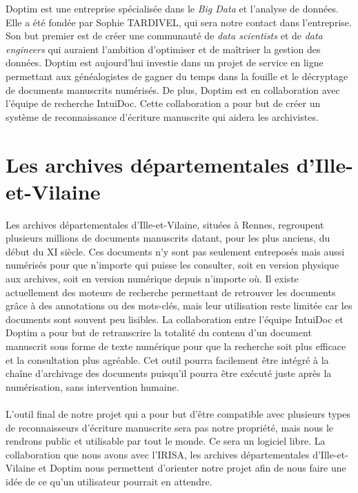 Doptim est une entreprise spécialisée dans le \textit{Big Data} et l’analyse de données.
Elle a été fondée par Sophie TARDIVEL, qui sera notre contact dans l’entreprise.
Son but premier est de créer une communauté de \textit{data scientists} et de
\textit{data engineers} qui auraient l’ambition d’optimiser et de maîtriser la gestion
des données. Doptim est aujourd’hui investie dans un projet de service en ligne permettant
aux généalogistes de gagner du temps dans la fouille et le décryptage de documents manuscrits
numérisés. De plus, Doptim est en collaboration avec l’équipe de recherche IntuiDoc. Cette
collaboration a pour but de créer un système de reconnaissance d’écriture manuscrite qui aidera
les archivistes.

\section{Les archives départementales d’Ille-et-Vilaine}

Les archives départementales d’Ille-et-Vilaine, situées à Rennes, regroupent plusieurs
millions de documents manuscrits datant, pour les plus anciens, du début du XI siècle.
Ces documents n’y sont pas seulement entreposés mais aussi numérisés pour que n’importe qui
puisse les consulter, soit en version physique aux archives, soit en version numérique
depuis n’importe où. Il existe actuellement des moteurs de recherche permettant de retrouver
les documents grâce à des annotations ou des mots-clés, mais leur utilisation reste limitée
car les documents sont souvent peu lisibles. La collaboration entre l'équipe IntuiDoc et Doptim
a pour but de retranscrire la totalité du contenu d’un document manuscrit sous forme de
texte numérique pour que la recherche soit plus efficace et la consultation plus agréable.
Cet outil pourra facilement être intégré à la chaîne d’archivage des documents puisqu’il pourra
être exécuté juste après la numérisation, sans intervention humaine.

\paragraph{}
L’outil final de notre projet qui a pour but d’être compatible avec plusieurs types de
reconnaisseurs d’écriture manuscrite sera pas notre propriété, mais nous le rendrons public et
utilisable par tout le monde. Ce sera un logiciel libre. La collaboration que nous avons avec
l’IRISA, les archives départementales d’Ille-et-Vilaine et Doptim nous permettent d’orienter
notre projet afin de nous faire une idée de ce qu’un utilisateur pourrait en attendre.